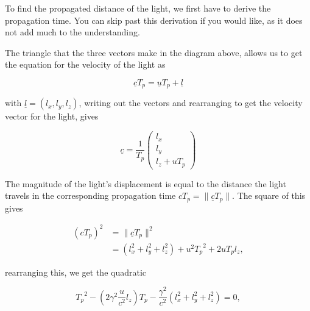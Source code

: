 To find the propagated distance of the light, we first have to derive the propagation time.
You can skip past this derivation if you would like, as it does not add much to the understanding.

\begin{derivation}

	The triangle that the three vectors make in the diagram above, allows us to get the equation for the velocity of the light as

	\begin{equation}
		\underline{c} T_p = \underline{u} T_p + \underline{l}
	\end{equation}

	with $\underline{l}=(l_{x},l_{y},l_{z})$, writing out the vectors and rearranging to get the velocity vector for the light, gives

	\begin{equation}
		\label{eq: retarded light velocity vector}
		\underline{c} = \frac{1}{ T_p}
		\begin{pmatrix}
			l_{x} \\
			l_{y} \\
			l_{z} + u T_p
		\end{pmatrix}
	\end{equation}

	The magnitude of the light's displacement is equal to the distance the light travels in the corresponding propagation time $ c T_p = \|\underline{c} T_p\|$. The square of this gives

	\begin{equation}
		\begin{aligned}
			\left( c T_p\right)^2 & = \|\underline{c} T_p\|^2                                     \\
			                      & = (l_{x}^2 + l_{y}^2 + l_{z}^2) + u^2 {T_p}^2 + 2u T_p l_{z},
		\end{aligned}
	\end{equation}

	rearranging this, we get the quadratic

	\begin{equation}
		{T_p}^{2} - \left(2\gamma^2\frac{u}{c^2} l_{z}\right)T_p - \frac{\gamma^2}{c^2}(l_{x}^2 + l_{y}^2 + l_{z}^2) = 0,
	\end{equation}


\end{derivation}
